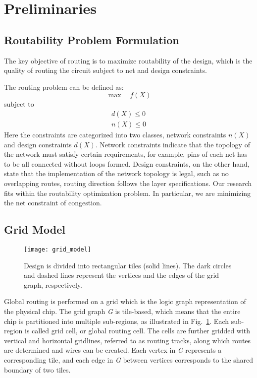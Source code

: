 \section{Preliminaries}
\label{sec:prelim}

\subsection{Routability Problem Formulation}
The key objective of routing is to maximize routability of the design, which is the quality of routing the circuit subject to net and design constraints.

The routing problem can be defined as:
\begin{equation}
\max \quad f(X) 
\end{equation}
subject to
\begin{equation}
\begin{split}
d(X) \leq 0 \\
n(X) \leq 0
\end{split}
\end{equation}
Here the constraints are categorized into two classes, network constraints $n(X)$ and design constraints $d(X)$. Network constraints indicate that the topology of the network must satisfy certain requirements, for example, pins of each net has to be all connected without loops formed. Design constraints, on the other hand, state that the implementation of the network topology is legal, such as no overlapping routes, routing direction follows the layer specifications. Our research fits within the routability optimization problem. In particular, we are minimizing the net constraint of congestion.

\subsection{Grid Model}
\label{subsec:grid model}
\begin{figure}[htbp]
	\centerline{\texttt{[image: grid\_model]}}
	\caption{Design is divided into rectangular tiles (solid lines). The dark
		circles and dashed lines represent the vertices and the edges of the grid graph, respectively.}
	\label{fig:grid_model}
\end{figure}

Global routing is performed on a grid which is the logic graph representation of the physical chip. The grid graph \emph{G} is tile-based, which means that the entire chip is partitioned into multiple sub-regions, as illustrated in Fig.~\ref{fig:grid_model}. Each sub-region is called grid cell, or global routing cell. The cells are further gridded with vertical and horizontal gridlines, referred to as routing tracks, along which routes are determined and wires can be created. Each vertex in \emph{G} represents a corresponding tile, and each edge in \emph{G} between vertices corresponds to the shared boundary of two tiles.

